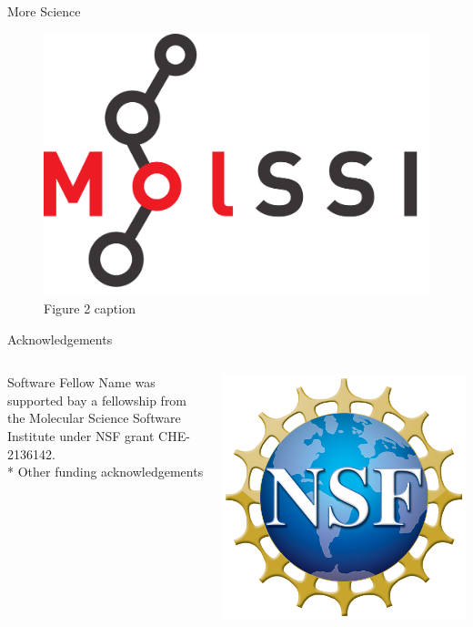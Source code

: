 \documentclass{beamer}
\begin{document}
\begin{frame}
\begin{columns}[t]
\begin{column}{.417\linewidth}
        \begin{section}{More Science}
          \lipsum[1-4]

          \begin{figure}[h]
            \includegraphics[width=0.65\linewidth]{./images/molssi_main_logo.png}
            \caption{Figure 2 caption}
          \end{figure}
        \end{section}

        \begin{section}{Acknowledgements}
          \begin{columns}
            \begin{column}{.75\linewidth}
            Software Fellow Name was supported bay a fellowship from the Molecular Science Software Institute under NSF grant  CHE-2136142.\\
* Other funding acknowledgements
            \end{column}
            \begin{column}{.2\linewidth}
              \includegraphics[width=0.9\linewidth]{./images/nsf.png}
            \end{column}
          \end{columns}


\end{section}
\end{column}
\end{columns}
\end{frame}
\end{document}
